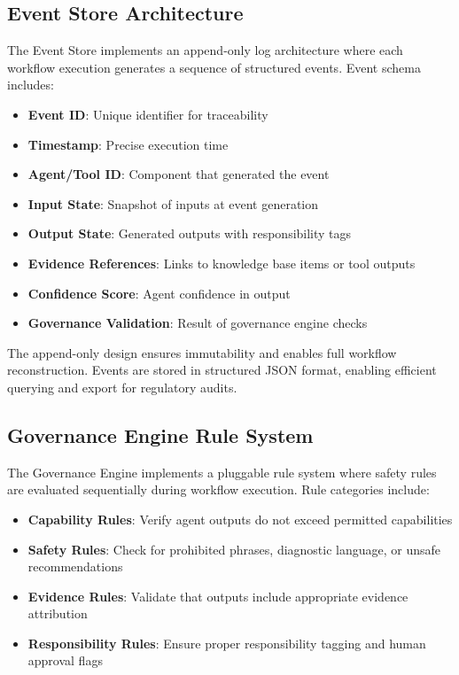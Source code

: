 \documentclass[conference]{IEEEtran}
\begin{document}
\subsection{Event Store Architecture}
The Event Store implements an append-only log architecture where each workflow execution generates a sequence of structured events. Event schema includes:

\begin{itemize}
    \item \textbf{Event ID}: Unique identifier for traceability
    \item \textbf{Timestamp}: Precise execution time
    \item \textbf{Agent/Tool ID}: Component that generated the event
    \item \textbf{Input State}: Snapshot of inputs at event generation
    \item \textbf{Output State}: Generated outputs with responsibility tags
    \item \textbf{Evidence References}: Links to knowledge base items or tool outputs
    \item \textbf{Confidence Score}: Agent confidence in output
    \item \textbf{Governance Validation}: Result of governance engine checks
\end{itemize}

The append-only design ensures immutability and enables full workflow reconstruction. Events are stored in structured JSON format, enabling efficient querying and export for regulatory audits.

\subsection{Governance Engine Rule System}
The Governance Engine implements a pluggable rule system where safety rules are evaluated sequentially during workflow execution. Rule categories include:

\begin{itemize}
    \item \textbf{Capability Rules}: Verify agent outputs do not exceed permitted capabilities
    \item \textbf{Safety Rules}: Check for prohibited phrases, diagnostic language, or unsafe recommendations
    \item \textbf{Evidence Rules}: Validate that outputs include appropriate evidence attribution
    \item \textbf{Responsibility Rules}: Ensure proper responsibility tagging and human approval flags
\end{itemize}
\end{document}

